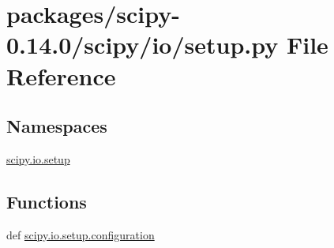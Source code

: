 \hypertarget{packages_2scipy-0_814_80_2scipy_2io_2setup_8py}{}\section{packages/scipy-\/0.14.0/scipy/io/setup.py File Reference}
\label{packages_2scipy-0_814_80_2scipy_2io_2setup_8py}
\subsection*{Namespaces}
\begin{DoxyCompactItemize}
\item 
 \hyperlink{namespacescipy_1_1io_1_1setup}{scipy.\+io.\+setup}
\end{DoxyCompactItemize}
\subsection*{Functions}
\begin{DoxyCompactItemize}
\item 
def \hyperlink{namespacescipy_1_1io_1_1setup_a45b36270f14e48a844c2a2729306d204}{scipy.\+io.\+setup.\+configuration}
\end{DoxyCompactItemize}
